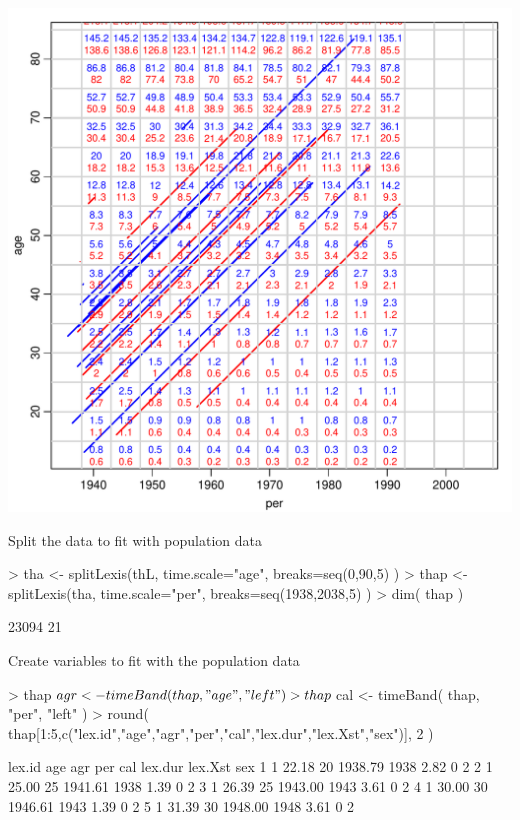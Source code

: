 \begin{frame}[fragile]
\includegraphics[height=0.99\textheight,keepaspectratio]{thL-lexis4}
\end{frame}

\begin{frame}[fragile]{Split the data to fit with population data}
\begin{Schunk}
\begin{Sinput}
> tha  <- splitLexis(thL, time.scale="age", breaks=seq(0,90,5) )
> thap <- splitLexis(tha, time.scale="per", breaks=seq(1938,2038,5) )
> dim( thap )
\end{Sinput}
\begin{Soutput}
[1] 23094    21
\end{Soutput}
\end{Schunk}
\pause
\vspace*{-1em}
Create variables to fit with the population data
\vspace*{-1ex}
\begin{Schunk}
\begin{Sinput}
> thap$agr <- timeBand( thap, "age", "left" )
> thap$cal <- timeBand( thap, "per", "left" )
> round( thap[1:5,c("lex.id","age","agr","per","cal","lex.dur","lex.Xst","sex")], 2 )
\end{Sinput}
\begin{Soutput}
  lex.id   age agr     per  cal lex.dur lex.Xst sex
1      1 22.18  20 1938.79 1938    2.82       0   2
2      1 25.00  25 1941.61 1938    1.39       0   2
3      1 26.39  25 1943.00 1943    3.61       0   2
4      1 30.00  30 1946.61 1943    1.39       0   2
5      1 31.39  30 1948.00 1948    3.61       0   2
\end{Soutput}
\end{Schunk}
\end{frame}

